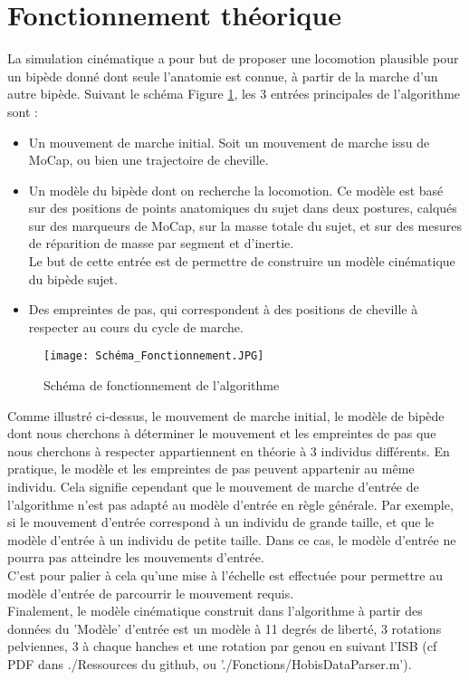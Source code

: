 \documentclass{article}
\begin{document}
\newpage
\section{Fonctionnement théorique}

La simulation cinématique a pour but de proposer une locomotion plausible pour un bipède donné dont seule l'anatomie est connue, à partir de la marche d'un autre bipède.
%
Suivant le schéma Figure \ref{fig:Sch1}, les 3 entrées principales de l'algorithme sont : 
\begin{itemize}
    \item Un mouvement de marche initial. Soit un mouvement de marche issu de MoCap, ou bien une trajectoire de cheville.
    \item Un modèle du bipède dont on recherche la locomotion. Ce modèle est basé sur des positions de points anatomiques du sujet dans deux postures, calqués sur des marqueurs de MoCap, sur la masse totale du sujet, et sur des mesures de réparition de masse par segment et d'inertie.\\
    Le but de cette entrée est de permettre de construire un modèle cinématique du bipède sujet.
    \item Des empreintes de pas, qui correspondent à des positions de cheville à respecter au cours du cycle de marche.
\end{itemize}


\begin{figure}[H]
    \centering
    \texttt{[image: Schéma\_Fonctionnement.JPG]}
    \caption{Schéma de fonctionnement de l'algorithme}
    \label{fig:Sch1}
\end{figure}

Comme illustré ci-dessus, le mouvement de marche initial, le modèle de bipède dont nous cherchons à déterminer le mouvement et les empreintes de pas que nous cherchons à respecter appartiennent en théorie à 3 individus différents.
%
En pratique, le modèle et les empreintes de pas peuvent appartenir au même individu. 
%
Cela signifie cependant que le mouvement de marche d'entrée de l'algorithme n'est pas adapté au modèle d'entrée en règle générale. Par exemple, si le mouvement d'entrée correspond à un individu de grande taille, et que le modèle d'entrée à un individu de petite taille. Dans ce cas, le modèle d'entrée ne pourra pas atteindre les mouvements d'entrée.\\
% 
C'est pour palier à cela qu'une mise à l'échelle est effectuée pour permettre au modèle d'entrée de parcourrir le mouvement requis.\\
%
Finalement, le modèle cinématique construit dans l'algorithme à partir des données du 'Modèle' d'entrée est un modèle à 11 degrés de liberté, 3 rotations pelviennes, 3 à chaque hanches et une rotation par genou en suivant l'ISB (cf PDF dans ./Ressources du github, ou './Fonctions/HobisDataParser.m').
\end{document}
